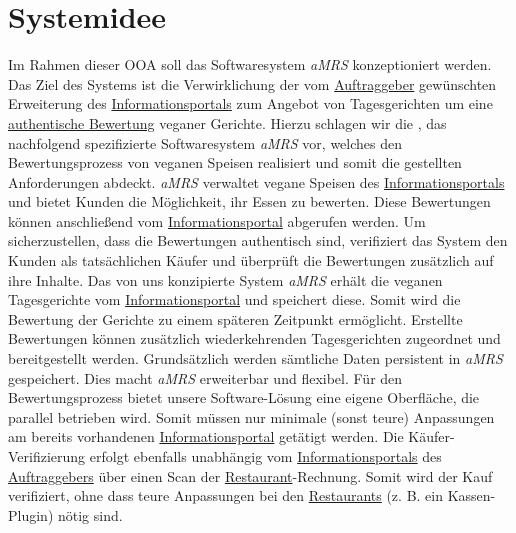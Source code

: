 \section{Systemidee}

Im Rahmen dieser \ac{OOA} soll das Softwaresystem \textit{\ac{aMRS}} konzeptioniert werden.
\newparagraph
Das Ziel des Systems ist die Verwirklichung der vom \hyperref[gls:auftraggeber]{Auftraggeber} gewünschten Erweiterung des \hyperref[gls:informationsportal]{Informationsportals} zum Angebot von Tagesgerichten um eine \hyperref[gls:authentischeBewertung]{authentische Bewertung} veganer Gerichte.
Hierzu schlagen wir die \textit{\vFKW}, das nachfolgend spezifizierte Softwaresystem \textit{\ac{aMRS}} vor, welches den Bewertungsprozess von veganen Speisen realisiert und somit die gestellten Anforderungen abdeckt.
\textit{\ac{aMRS}} verwaltet vegane Speisen des \hyperref[gls:informationsportal]{Informationsportals} und bietet Kunden die Möglichkeit, ihr Essen zu bewerten.
Diese Bewertungen können anschließend vom \hyperref[gls:informationsportal]{Informationsportal} abgerufen werden.
Um sicherzustellen, dass die Bewertungen authentisch sind, verifiziert das System den Kunden als tatsächlichen Käufer und überprüft die Bewertungen zusätzlich auf ihre Inhalte.
\newparagraph
Das von uns konzipierte System \textit{\ac{aMRS}} erhält die veganen Tagesgerichte vom \hyperref[gls:informationsportal]{Informationsportal} und speichert diese.
Somit wird die Bewertung der Gerichte zu einem späteren Zeitpunkt ermöglicht.
Erstellte Bewertungen können zusätzlich wiederkehrenden Tagesgerichten zugeordnet und bereitgestellt werden. Grundsätzlich werden sämtliche Daten persistent in \textit{\ac{aMRS}} gespeichert.
Dies macht \textit{\ac{aMRS}} erweiterbar und flexibel.
\newparagraph
Für den Bewertungsprozess bietet unsere Software-Lösung eine eigene Oberfläche, die parallel betrieben wird.
Somit müssen nur minimale (sonst teure) Anpassungen am bereits vorhandenen \hyperref[gls:informationsportal]{Informationsportal} getätigt werden.
Die Käufer-Verifizierung erfolgt ebenfalls unabhängig vom \hyperref[gls:informationsportal]{Informationsportals} des \hyperref[gls:auftraggeber]{Auftraggebers} über einen Scan der \hyperref[gls:restaurant]{Restaurant}-Rechnung.
Somit wird der Kauf verifiziert, ohne dass teure Anpassungen bei den \hyperref[gls:restaurant]{Restaurants} (z. B. ein Kassen-Plugin) nötig sind.

